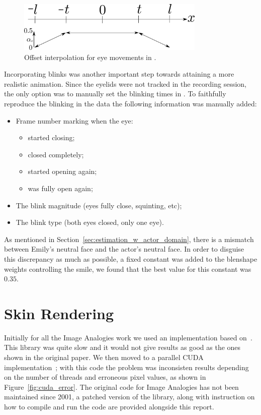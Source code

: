 \begin{figure}[htbp!]
\centering
\includegraphics[width=0.8\textwidth]{img/eyes_interpolation}
	\caption{Offset interpolation for eye movements in \Maya.}
	\label{fig:eyes_interpolation}
\end{figure}

Incorporating blinks was another important step towards attaining a more realistic animation.
Since the eyelids were not tracked in the recording session, the only option was to manually set the blinking times in \Maya.
To faithfully reproduce the blinking in the data the following information was manually added:
\begin{itemize}
\item Frame number marking when the eye:
	\begin{itemize}
	\item started closing;
	\item closed completely;
	\item started opening again;
	\item was fully open again;
	\end{itemize}
\item The blink magnitude (eyes fully close, squinting, etc);
\item The blink type (both eyes closed, only one eye).
\end{itemize}

As mentioned in Section~\ref{sec:estimation_w_actor_domain}, there is a mismatch between Emily's neutral face and the actor's neutral face.
In order to disguise this discrepancy as much as possible, a fixed constant was added to the blenshape weights controlling the smile, we found that the best value for this constant was $0.35$.


\section{Skin Rendering}

Initially for all the Image Analogies work we used an implementation based on~\cite{ImAnSingleThreadWeb}.
This library was quite slow and it would not give results as good as the ones shown in the original paper.
We then moved to a parallel CUDA implementation~\cite{ImAnCudaWeb}; with this code the problem was inconsisten results depending on the number of threads and erroneous pixel values, as shown in Figure~\ref{fig:cuda_error}.
The original code for Image Analogies has not been maintained since 2001, a patched version of the library, along with instruction on how to compile and run the code are provided alongside this report.

